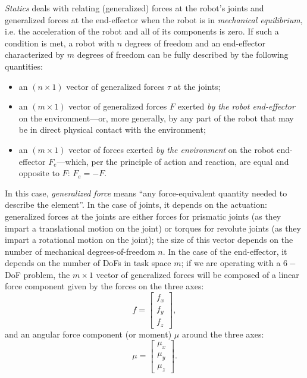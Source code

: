 \textsl{Statics} deals with relating (generalized) forces at the robot's joints and generalized forces at the end-effector when the robot is in \textsl{mechanical equilibrium}, i.e. the acceleration of the robot and all of its components is zero.
If such a condition is met, a robot with $n$ degrees of freedom and an end-effector characterized by $m$ degrees of freedom can be fully described by the following quantities:
\begin{itemize}
    \item an $\left( n \times 1 \right)$ vector of generalized forces $\tau$ at the joints;
    \item an $\left( m \times 1 \right)$ vector of generalized forces $F$ exerted \textsl{by the robot end-effector} on the environment---or, more generally, by any part of the robot that may be in direct physical contact with the environment;
    \item an $\left( m \times 1 \right)$ vector of forces exerted \textsl{by the environment} on the robot end-effector $F_e$---which, per the principle of action and reaction, are equal and opposite to $F$: $F_e=-F$.
\end{itemize}
In this case, \textsl{generalized force} means ``any force-equivalent quantity needed to describe the element''.
In the case of joints, it depends on the actuation: generalized forces at the joints are either forces for prismatic joints (as they impart a translational motion on the joint) or torques for revolute joints (as they impart a rotational motion on the joint); the size of this vector depends on the number of mechanical degrees-of-freedom $n$.
In the case of the end-effector, it depends on the number of DoFs in task space $m$; if we are operating with a $6-$DoF problem, the $m \times 1$ vector of generalized forces will be composed of a linear force component given by the forces on the three axes:
\begin{equation}
f=\left[\begin{array}{c}
f_x\\
f_y\\
f_z
\end{array}
\right],
\end{equation}
and an angular force component (or moment) $\mu$ around the three axes:
\begin{equation}
\mu=\left[\begin{array}{c}
\mu_x\\
\mu_y\\
\mu_z
\end{array}
\right].
\end{equation}
